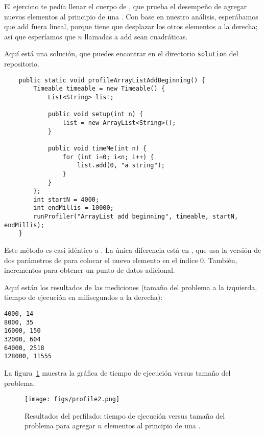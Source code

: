 \documentclass[12pt]{book}
\theoremstyle{exercise}
\begin{document}


El ejercicio te pedía llenar el cuerpo de
, que prueba el desempeño de
agregar nuevos elementos al principio de una . Con base en
nuestro análisis, esperábamos que add fuera lineal, porque tiene que desplazar
los otros elementos a la derecha; así que esperíamos que $n$ llamadas a add
sean cuadráticas.


Aquí está una solución, que puedes encontrar en
el directorio {\tt solution} del repositorio.

\begin{verbatim}
    public static void profileArrayListAddBeginning() {
        Timeable timeable = new Timeable() {
            List<String> list;

            public void setup(int n) {
                list = new ArrayList<String>();
            }

            public void timeMe(int n) {
                for (int i=0; i<n; i++) {
                    list.add(0, "a string");
                }
            }
        };
        int startN = 4000;
        int endMillis = 10000;
        runProfiler("ArrayList add beginning", timeable, startN, endMillis);
    }
\end{verbatim}

Este método es casi idéntico a . La
única diferencia está en , que usa la versión de dos
parámetros de  para colocar el nuevo elemento en el índice 0. También,
incrementos  para obtener un punto de datos adicional.

Aquí están los resultados de las mediciones (tamaño del problema a la
izquierda, tiempo de ejecución en milisegundos a la derecha):

\begin{verbatim}
4000, 14
8000, 35
16000, 150
32000, 604
64000, 2518
128000, 11555
\end{verbatim}

La figura~\ref{fig-profile2}
muestra la gráfica de tiempo de ejecución versus tamaño del problema.

\begin{figure}
\centering
\texttt{[image: figs/profile2.png]}
\caption{Resultados del perfilado: tiempo de ejecución versus tamaño del problema para agregar
$n$ elementos al principio de una .}
\label{fig-profile2}
\end{figure}
\end{document}
